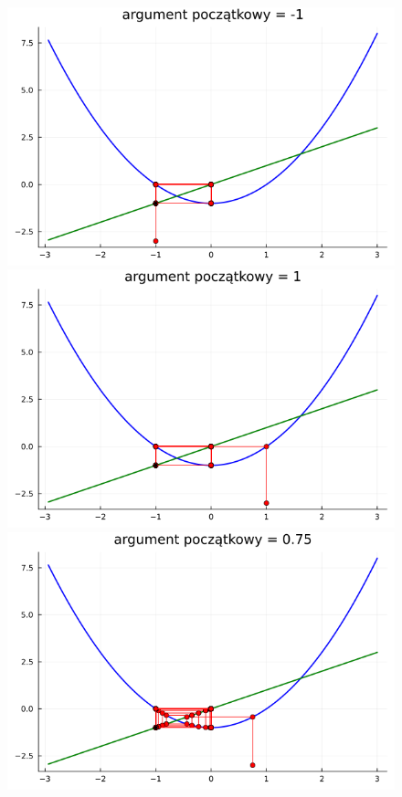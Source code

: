 \documentclass{article}
\begin{document}
\begin{figure}[h!]
    \centering
    \includegraphics[scale=0.39]{plots/x^2-1:-1.png}
    \includegraphics[scale=0.39]{plots/x^2-1:1.png}
    \includegraphics[scale=0.39]{plots/x^2-1:0.75.png}

\end{figure}
\end{document}
